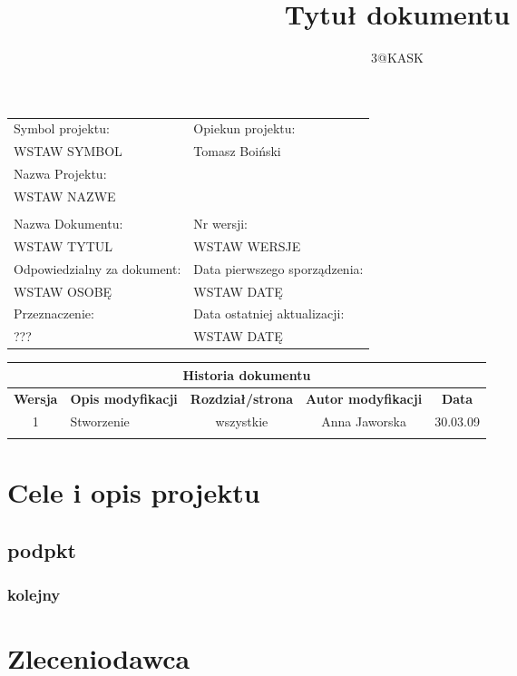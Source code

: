 \documentclass[a4paper,10pt]{article}
\title{Tytuł dokumentu}
\author{3@KASK}
\begin{document}



\maketitle


\begin{center}
\begin{tabular}{|p{7cm}|p{7cm}|}
\hline
Symbol projektu: & Opiekun projektu:   \tabularnewline 
WSTAW SYMBOL & Tomasz Boiński    \tabularnewline \hline
\multicolumn{2}{|l|}{Nazwa Projektu: } \tabularnewline
\multicolumn{2}{|l|}{WSTAW NAZWE } \tabularnewline 
\hline
\multicolumn{2}{l}{ } \tabularnewline %
\hline 
Nazwa Dokumentu: & Nr wersji:   \tabularnewline 
WSTAW TYTUL & WSTAW WERSJE \tabularnewline \hline
Odpowiedzialny za dokument: & Data pierwszego sporządzenia:   \tabularnewline 
WSTAW OSOBĘ & WSTAW DATĘ \tabularnewline \hline
Przeznaczenie: & Data ostatniej aktualizacji:   \tabularnewline 
??? & WSTAW DATĘ \tabularnewline \hline
\end{tabular}
\end{center}

\begin{center}
\begin{tabular}{|c|p{4cm}|c|c|c|}
\multicolumn{5}{c}{\textbf{Historia dokumentu}} \tabularnewline \hline
\textbf{Wersja} & \textbf{Opis modyfikacji} & \textbf{Rozdział/strona} & \textbf{Autor modyfikacji} & \textbf{Data} \tabularnewline \hline 
1 & Stworzenie & wszystkie & Anna Jaworska & 30.03.09 \tabularnewline \hline
& & & &\tabularnewline \hline
\end{tabular}
 

\end{center}


\newpage
\tableofcontents
\newpage

\section{Cele i opis projektu}
\subsection{podpkt}
\subsubsection{kolejny}
	
\section{Zleceniodawca}
\end{document}
